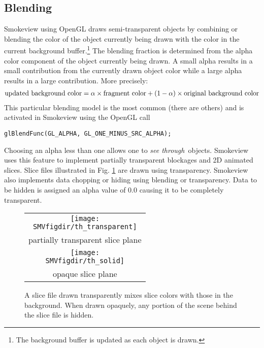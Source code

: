 \documentclass[11pt,twoside]{book}
\begin{document}
\subsection{Blending}
\label{blending} Smokeview using OpenGL draws semi-transparent
objects by combining or blending the color of the object currently
being drawn with the color in the current background
buffer.\footnote{The background buffer is updated as each object
is drawn.} The blending fraction is determined from the alpha
color component of the object currently being drawn. A small alpha
results in a small contribution from the currently drawn object
color while a large alpha results in a large contribution.  More
precisely:
\begin{eqnarray}
\noindent\mbox{updated background color} = \alpha\times
\mbox{fragment color} + (1-\alpha)\times \mbox{original background
color}
\end{eqnarray}
This particular blending model is the most common (there are
others) and is activated in Smokeview using the OpenGL call
\begin{lstlisting}
glBlendFunc(GL_ALPHA, GL_ONE_MINUS_SRC_ALPHA);
\end{lstlisting}

Choosing an alpha less than one allows one to {\em see through}\
objects. Smokeview uses this feature to implement partially
transparent blockages and 2D animated slices. Slice files
illustrated in Fig. \ref{figtransparent} are drawn using
transparency. Smokeview also implements data chopping or hiding
using blending or transparency.  Data to be hidden is assigned an
alpha value of 0.0 causing it to be completely transparent.

\begin{figure}[bph]
\begin{center}
\begin{tabular}{c}
\texttt{[image: \\SMVfigdir/th\_transparent]}\\
partially transparent slice plane\\
\texttt{[image: \\SMVfigdir/th\_solid]}\\
opaque slice plane\\
\end{tabular}
\end{center}
\caption {A slice file drawn transparently mixes
slice colors with those in the background.  When drawn opaquely,
any portion of the scene behind the slice file is hidden. }
\label{figtransparent}
\end{figure}
\end{document}

